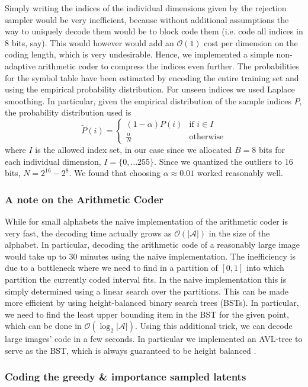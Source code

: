 \documentclass{article}
\newcommand{\A}{\mathcal{A}}
\newcommand{\Oh}{\mathcal{O}}
\begin{document}
\par
Simply writing the indices of the individual dimensions given by the rejection
sampler would be very inefficient, because without additional assumptions the
way to uniquely decode them would be to block code them (i.e. code all indices
in 8 bits, say). This would however would add an $\Oh(1)$ cost per dimension on
the coding length, which is very undesirable. Hence, we implemented a simple
non-adaptive arithmetic coder \cite{rissanen1981universal} to compress the 
indices even further. The
probabilities for the symbol table have been estimated  by encoding the entire
training set and using the empirical probability distribution. For unseen
indices we used Laplace smoothing. In particular, given the empirical
distribution of the sample indices $P$, the probability distribution
used is
\[
  \tilde{P}(i) = \begin{cases}
    (1 - \alpha)P(i) & \text{if } i \in I \\
    \frac{\alpha}{N} & \text{otherwise}
    \end{cases}
\]
where $I$ is the allowed index set, in our case since we allocated $B = 8$ bits
for each individual dimension, $I = \{0, \hdots 255\}$. Since we quantized the
outliers to 16 bits, $N = 2^{16} - 2^{8}$. We found that choosing $\alpha
\approx 0.01$ worked reasonably well.
\subsubsection{A note on the Arithmetic Coder}
\par
While for small alphabets the naive implementation of the arithmetic coder is
very fast, the decoding time actually grows as $\Oh(|\A|)$ in the size of the
alphabet. In particular, decoding the arithmetic code of a reasonably large
image would take up to 30 minutes using the naive implementation. The
inefficiency is due to a bottleneck where we need to find in a partition of $[0,
1]$ into which partition the currently coded interval fits. In the naive
implementation this is simply determined using a linear search over the
partitions. This can be made more efficient by using height-balanced binary
search trees (BSTs). In particular, we need to find the least upper bounding
item in the BST for the given point, which can be done in $\Oh(\log_2|\A|)$.
Using this additional trick, we can decode large images' code in a few seconds.
In particular we implemented an AVL-tree to serve as the BST, which is always
guaranteed to be height balanced \cite{adel1962algorithm}.
\subsubsection{Coding the greedy \& importance sampled latents}
\par
\end{document}
